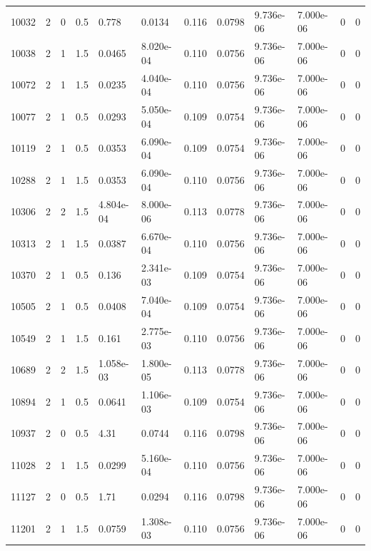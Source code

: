 \documentclass[preview]{standalone}
\begin{document}
{{{\begin{tabular}{L{1.2cm}C{1.2cm} C{0.3cm}C{0.5cm} C{1.4cm}C{1.4cm} C{1.4cm}C{1.4cm} C{1.6cm}C{1.6cm} C{1.6cm}C{1.6cm}}
  10032  &     2  & 0     & 0.5 &  0.778  & 0.0134  &  0.116&   0.0798& 9.736e-06 & 7.000e-06   &  0 & 0  \\ 
  10038  &     2  & 1     & 1.5 &  0.0465  & 8.020e-04  &  0.110&   0.0756& 9.736e-06 & 7.000e-06   &  0 & 0  \\ 
  10072  &     2  & 1     & 1.5 &  0.0235  & 4.040e-04  &  0.110&   0.0756& 9.736e-06 & 7.000e-06   &  0 & 0  \\ 
  10077  &     2  & 1     & 0.5 &  0.0293  & 5.050e-04  &  0.109&   0.0754& 9.736e-06 & 7.000e-06   &  0 & 0  \\ 
  10119  &     2  & 1     & 0.5 &  0.0353  & 6.090e-04  &  0.109&   0.0754& 9.736e-06 & 7.000e-06   &  0 & 0  \\ 
  10288  &     2  & 1     & 1.5 &  0.0353  & 6.090e-04  &  0.110&   0.0756& 9.736e-06 & 7.000e-06   &  0 & 0  \\ 
  10306  &     2  & 2     & 1.5 &  4.804e-04  & 8.000e-06  &  0.113&   0.0778& 9.736e-06 & 7.000e-06   &  0 & 0  \\ 
  10313  &     2  & 1     & 1.5 &  0.0387  & 6.670e-04  &  0.110&   0.0756& 9.736e-06 & 7.000e-06   &  0 & 0  \\ 
  10370  &     2  & 1     & 0.5 &  0.136  & 2.341e-03  &  0.109&   0.0754& 9.736e-06 & 7.000e-06   &  0 & 0  \\ 
  10505  &     2  & 1     & 0.5 &  0.0408  & 7.040e-04  &  0.109&   0.0754& 9.736e-06 & 7.000e-06   &  0 & 0  \\ 
  10549  &     2  & 1     & 1.5 &  0.161  & 2.775e-03  &  0.110&   0.0756& 9.736e-06 & 7.000e-06   &  0 & 0  \\ 
  10689  &     2  & 2     & 1.5 &  1.058e-03  & 1.800e-05  &  0.113&   0.0778& 9.736e-06 & 7.000e-06   &  0 & 0  \\ 
  10894  &     2  & 1     & 0.5 &  0.0641  & 1.106e-03  &  0.109&   0.0754& 9.736e-06 & 7.000e-06   &  0 & 0  \\ 
  10937  &     2  & 0     & 0.5 &  4.31  & 0.0744  &  0.116&   0.0798& 9.736e-06 & 7.000e-06   &  0 & 0  \\ 
  11028  &     2  & 1     & 1.5 &  0.0299  & 5.160e-04  &  0.110&   0.0756& 9.736e-06 & 7.000e-06   &  0 & 0  \\ 
  11127  &     2  & 0     & 0.5 &  1.71  & 0.0294  &  0.116&   0.0798& 9.736e-06 & 7.000e-06   &  0 & 0  \\ 
  11201  &     2  & 1     & 1.5 &  0.0759  & 1.308e-03  &  0.110&   0.0756& 9.736e-06 & 7.000e-06   &  0 & 0  \\ 

\end{tabular}}}}
\end{document}
